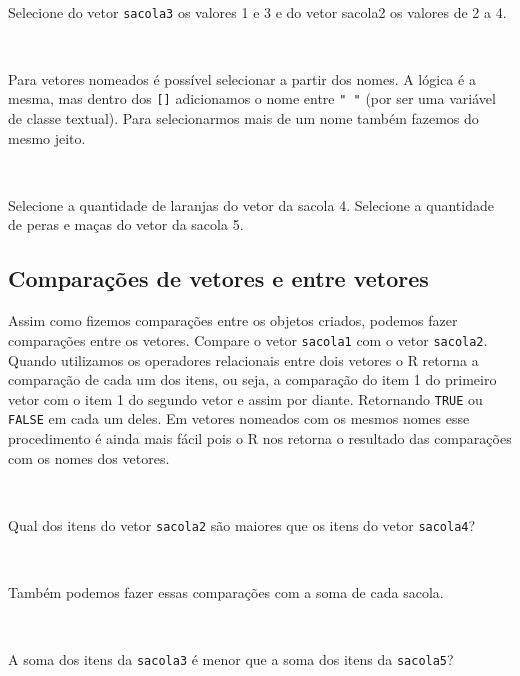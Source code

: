 \documentclass[]{book}
\theoremstyle{definition}
\theoremstyle{definition}
\theoremstyle{definition}
\theoremstyle{remark}
\let\BeginKnitrBlock\begin \let\EndKnitrBlock\end
\begin{document}
~

\BeginKnitrBlock{exercise}
\protect\hypertarget{exr:unnamed-chunk-33}{}{\label{exr:unnamed-chunk-33} }Selecione do vetor \texttt{sacola3} os valores 1 e 3 e do vetor sacola2 os valores de 2 a 4.
\EndKnitrBlock{exercise}

~

Para vetores nomeados é possível selecionar a partir dos nomes. A lógica é a mesma, mas dentro dos \texttt{{[}{]}} adicionamos o nome entre \texttt{"\ "} (por ser uma variável de classe textual). Para selecionarmos mais de um nome também fazemos do mesmo jeito.

~

\BeginKnitrBlock{exercise}
\protect\hypertarget{exr:unnamed-chunk-34}{}{\label{exr:unnamed-chunk-34} }Selecione a quantidade de laranjas do vetor da sacola 4. Selecione a quantidade de peras e maças do vetor da sacola 5.
\EndKnitrBlock{exercise}

\hypertarget{comparauxe7uxf5es-de-vetores-e-entre-vetores}{%
\subsection{Comparações de vetores e entre vetores}\label{comparauxe7uxf5es-de-vetores-e-entre-vetores}}

Assim como fizemos comparações entre os objetos criados, podemos fazer comparações entre os vetores. Compare o vetor \texttt{sacola1} com o vetor \texttt{sacola2}. Quando utilizamos os operadores relacionais entre dois vetores o R retorna a comparação de cada um dos itens, ou seja, a comparação do item 1 do primeiro vetor com o item 1 do segundo vetor e assim por diante. Retornando \texttt{TRUE} ou \texttt{FALSE} em cada um deles. Em vetores nomeados com os mesmos nomes esse procedimento é ainda mais fácil pois o R nos retorna o resultado das comparações com os nomes dos vetores.

~

\BeginKnitrBlock{exercise}
\protect\hypertarget{exr:unnamed-chunk-35}{}{\label{exr:unnamed-chunk-35} }Qual dos itens do vetor \texttt{sacola2} são maiores que os itens do vetor \texttt{sacola4}?
\EndKnitrBlock{exercise}

~

Também podemos fazer essas comparações com a soma de cada sacola.

~

\BeginKnitrBlock{exercise}
\protect\hypertarget{exr:unnamed-chunk-36}{}{\label{exr:unnamed-chunk-36} }A soma dos itens da \texttt{sacola3} é menor que a soma dos itens da \texttt{sacola5}?
\EndKnitrBlock{exercise}
\end{document}
